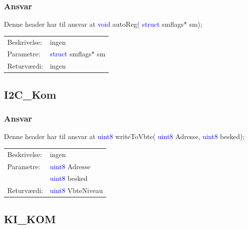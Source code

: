 \subsubsection{Ansvar}
Denne header har til ansvar at 
\textcolor{blue}{void} autoReg( \textcolor{blue}{struct} smflags* sm); 
\begin{table}[H]
\begin{tabular}{l p{12.5cm}}
\hline
Beskrivelse:& ingen\\
Parametre:&\textcolor{blue}{struct} smflags* sm\\
Returværdi:&ingen\\
\end{tabular}
\end{table}

\subsection{I2C\_Kom}
\subsubsection{Ansvar}
Denne header har til ansvar at 
\textcolor{blue}{uint8} writeToVbte( \textcolor{blue}{uint8} Adresse, \textcolor{blue}{uint8} besked); 
\begin{table}[H]
\begin{tabular}{l p{12.5cm}}
\hline
Beskrivelse:& ingen\\
Parametre:&\textcolor{blue}{uint8} Adresse\\
 &\textcolor{blue}{uint8} besked\\
Returværdi:&\textcolor{blue}{uint8} VbteNiveau\\
\end{tabular}
\end{table}

\subsection{KI\_KOM}
